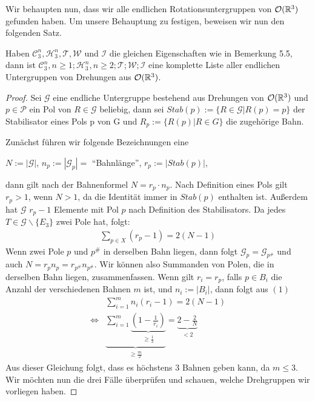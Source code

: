 Wir behaupten nun, dass wir alle endlichen Rotationsuntergruppen von ${\mathcal{O}(\mathbb{R}^3)}$ gefunden haben. Um unsere Behauptung zu festigen, beweisen wir nun den folgenden Satz.
\begin{theorem}
	Haben $\mathcal{C}^n_3,\mathcal{H}^n_3,\mathcal{T},\mathcal{W}$ und $\mathcal{I}$ die gleichen Eigenschaften wie in Bemerkung 5.5, dann ist $\mathcal{C}^n_3,n\geq1;\mathcal{H}^n_3,n\geq2;\mathcal{T};\mathcal{W};\mathcal{I}$ eine komplette Liste aller endlichen Untergruppen von Drehungen aus ${\mathcal{O}(\mathbb{R}^3)}$.
\end{theorem}
\begin{proof}
	Sei $\mathcal{G}$ eine endliche Untergruppe bestehend aus Drehungen von ${\mathcal{O}(\mathbb{R}^3)}$ und $p \in \mathcal{P}$ ein Pol von $R \in \mathcal{G}$ beliebig, dann sei $Stab(p) := \{R\in \mathcal{G} | R(p)=p\}$ der Stabilisator eines Pols p von G und $R_p := \{R(p) | R \in G \}$ die zugehörige Bahn.
	
	Zunächst führen wir folgende Bezeichnungen eine
	\begin{center}
		$N:=|\mathcal{G}|$, $n_p:=|\mathcal{G}_p|=$ "`Bahnlänge"', $r_p:=|Stab(p)|$,
	\end{center}
	dann gilt nach der Bahnenformel $N=r_p \cdot n_p$. Nach Definition eines Pols gilt $r_p > 1$, wenn $N > 1$, da die Identität immer in $Stab(p)$ enthalten ist. Außerdem hat $\mathcal{G}$ $r_p - 1$ Elemente mit Pol $p$ nach Definition des Stabilisators. Da jedes $T \in \mathcal{G}\backslash\{E_3\}$ zwei Pole hat, folgt:
	\setcounter{equation}{0}
	\begin{align}
	\sum_{p \in X}(r_p - 1)= 2(N-1)
	\end{align}
	Wenn zwei Pole $p$ und $p^{\#}$ in derselben Bahn liegen, dann folgt $\mathcal{G}_p=\mathcal{G}_{p^{\#}}$ und auch $N=r_p n_p=r_{p^{\#}} n_{p^{\#}}$. Wir können also Summanden von Polen, die in derselben Bahn liegen, zusammenfassen. Wenn gilt $r_i=r_p$, falls $p\in B_i$ die Anzahl der verschiedenen Bahnen $m$ ist, und $n_i:=|B_i|$, dann folgt aus $(1)$
	\begin{align}
	&\sum_{i=1}^m n_i(r_i-1)=2(N-1) \\
	\Leftrightarrow &\underbrace{\sum_{i=1}^m \underbrace{(1-\frac{1}{r_i})}_{\substack{\geq \frac{1}{2}}}}_{\substack{\geq \frac{m}{2}}}=\underbrace{2-\frac{2}{N}}_{\substack{<2}}
	\end{align}
	Aus dieser Gleichung folgt, dass es höchstens 3 Bahnen geben kann, da $m \leq 3$. Wir möchten nun die drei Fälle überprüfen und schauen, welche Drehgruppen wir vorliegen haben.
	

\end{proof}
